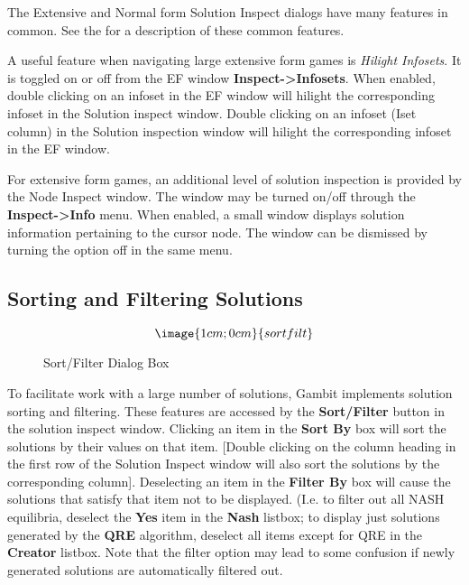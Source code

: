 The Extensive and Normal form Solution Inspect dialogs have many
features in common.  See the  for a description of these common features.

A useful feature when navigating large extensive form games is {\em 
Hilight Infosets}.  It is toggled on or off from the EF window {\bf 
Inspect->Infosets}.  When enabled, double clicking on an infoset in
the EF window will hilight the corresponding infoset in the Solution
inspect window.  Double clicking on an infoset (Iset column) in the
Solution inspection window will hilight the corresponding infoset in
the EF window.

For extensive form games, an additional level of solution inspection
is provided by the Node Inspect window.  The window may be turned
on/off through the {\bf Inspect->Info} menu. When enabled, a small
window displays solution information pertaining to the cursor node.
The window can be dismissed by turning the option off in the same
menu.


\subsection{Sorting and Filtering Solutions}\label{SolnSortFilt}
\begin{figure}
$$\image{1cm;0cm}{sortfilt}$$
\caption{Sort/Filter Dialog Box}\label{fig_nfgsortfilt}
\end{figure}

To facilitate work with a large number of solutions, Gambit implements
solution sorting and filtering.  These features are accessed by the
{\bf Sort/Filter} button in the solution inspect window.  Clicking an
item in the {\bf Sort By} box will sort the solutions by their values
on that item.  [Double clicking on the column heading in the first row
of the Solution Inspect window will also sort the solutions by the
corresponding column].  Deselecting an item in the {\bf Filter By} box
will cause the solutions that satisfy that item not to be displayed.
(I.e. to filter out all NASH equilibria, deselect the {\bf Yes} item
in the {\bf Nash} listbox; to display just solutions generated by the
{\bf QRE} algorithm, deselect all items except for QRE in the {\bf 
Creator} listbox.  Note that the filter option may lead to some
confusion if newly generated solutions are automatically filtered out.

